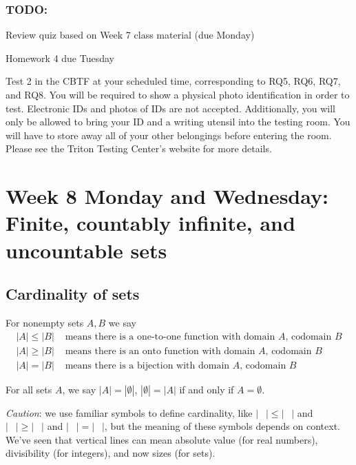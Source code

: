 \documentclass[12pt, oneside]{article}
\begin{document}
\subsubsection*{TODO:}
\begin{list}
   {\itemsep2pt}
    \item Review quiz based on Week 7 class material (due Monday)
    \item Homework 4 due Tuesday
    \item Test 2 in the CBTF at your scheduled time, corresponding to RQ5, RQ6, RQ7, and RQ8.
You will be required to show a physical photo identification in order
to test. Electronic IDs and photos of IDs are not accepted. Additionally, you will only be allowed
to bring your ID and a writing utensil into the testing room. You will have to store away all of
your other belongings before entering the room. Please see the Triton Testing Center's website
for more details.
\end{list}

\newpage


\section*{Week 8 Monday and Wednesday: Finite, countably infinite, and uncountable sets}
\subsection*{Cardinality of sets}

For nonempty sets $A, B$ we say
\begin{align*}
|A| \leq |B| &\text{ means there is a one-to-one function with domain $A$, codomain $B$} \\
|A| \geq |B| &\text{ means there is an onto function with domain $A$, codomain $B$} \\
|A| = |B| &\text{ means there is a bijection with domain $A$, codomain $B$}
\end{align*}

For all sets $A$, we say $|A| = |\emptyset|$, $|\emptyset| = |A|$ if and only if $A = \emptyset$. 

{\it Caution}: we use 
familiar symbols to define cardinality, like
$| \phantom{\cdots} | \leq | \phantom{\cdots} |$
and 
$| \phantom{\cdots} | \geq | \phantom{\cdots} |$
and 
$| \phantom{\cdots} | = | \phantom{\cdots} |$, 
but the meaning of these symbols depends on context.
We've seen that vertical lines can mean absolute
value (for real numbers), divisibility (for integers), 
and now sizes (for sets). 
\end{document}

